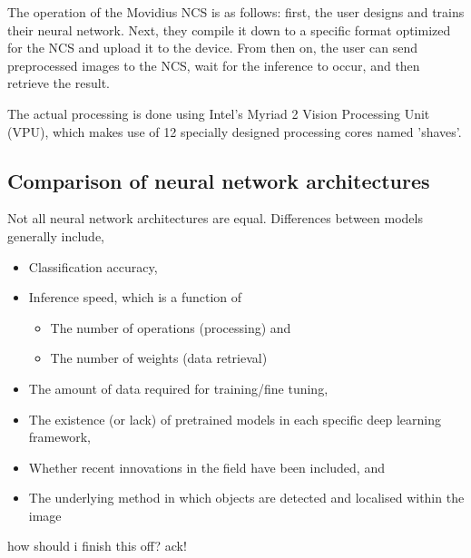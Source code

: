 The operation of the Movidius NCS is as follows: first, the user designs and trains their neural network. Next, they compile it down to a specific format optimized for the NCS and upload it to the device. From then on, the user can send preprocessed images to the NCS, wait for the inference to occur, and then retrieve the result.

The actual processing is done using Intel's Myriad 2 Vision Processing Unit (VPU), which makes use of 12 specially designed processing cores named 'shaves'.



\subsection{Comparison of neural network architectures}
Not all neural network architectures are equal. Differences between models generally include,

\begin{itemize}
	\item Classification accuracy,
	\item Inference speed, which is a function of
	\begin{itemize}
		\item The number of operations (processing) and
		\item The number of weights (data retrieval)
	\end{itemize}
	\item The amount of data required for training/fine tuning,
	\item The existence (or lack) of pretrained models in each specific deep learning framework,
	\item Whether recent innovations in the field have been included, and
	\item The underlying method in which objects are detected and localised within the image
\end{itemize}

{\Huge \color{red} how should i finish this off? ack!}


